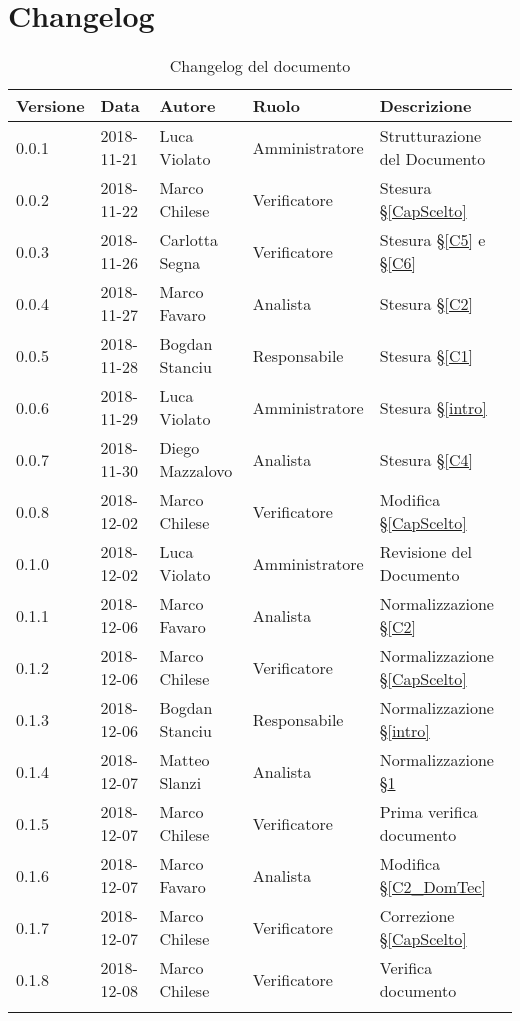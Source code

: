 \section{Changelog}\label{changelog}

\begin{center}
\begin{longtable}[c]{|m{}|m{}|m{}|m{}|p{}|}
\hline
\textbf{Versione} & \textbf{Data} & \textbf{Autore} & \textbf{Ruolo} & \textbf{Descrizione} \\
\hline \hline
\endfirsthead
0.0.1 & 2018-11-21 & Luca Violato & Amministratore & Strutturazione del Documento \\
\hline
0.0.2 & 2018-11-22 & Marco Chilese & Verificatore & Stesura §\ref{CapScelto} \\
\hline
0.0.3 & 2018-11-26 & Carlotta Segna & Verificatore & Stesura §\ref{C5} e §\ref{C6} \\
\hline
0.0.4 & 2018-11-27 & Marco Favaro & Analista & Stesura §\ref{C2} \\
\hline
0.0.5 & 2018-11-28 & Bogdan Stanciu & Responsabile & Stesura §\ref{C1}\\
\hline
0.0.6 & 2018-11-29 & Luca Violato & Amministratore & Stesura §\ref{intro}\\
\hline
0.0.7 & 2018-11-30 & Diego Mazzalovo & Analista & Stesura §\ref{C4} \\
\hline
0.0.8 & 2018-12-02 & Marco Chilese & Verificatore & Modifica §\ref{CapScelto} \\
\hline
0.1.0 & 2018-12-02 & Luca Violato & Amministratore & Revisione del Documento\\
\hline
0.1.1 & 2018-12-06 & Marco Favaro & Analista & Normalizzazione §\ref{C2}\\
\hline
0.1.2 & 2018-12-06 & Marco Chilese & Verificatore & Normalizzazione §\ref{CapScelto}\\
\hline
0.1.3 & 2018-12-06 & Bogdan Stanciu & Responsabile & Normalizzazione §\ref{intro}\\
\hline
0.1.4 & 2018-12-07 & Matteo Slanzi & Analista & Normalizzazione §\ref{changelog}\\
\hline
0.1.5 & 2018-12-07 & Marco Chilese & Verificatore & Prima verifica documento\\
\hline
0.1.6 & 2018-12-07 & Marco Favaro & Analista & Modifica §\ref{C2_DomTec}\\
\hline
0.1.7 & 2018-12-07 & Marco Chilese & Verificatore & Correzione §\ref{CapScelto}\\
\hline
0.1.8 & 2018-12-08 & Marco Chilese & Verificatore & Verifica documento\\
\hline
\caption{Changelog del documento}
\end{longtable}
\end{center}
